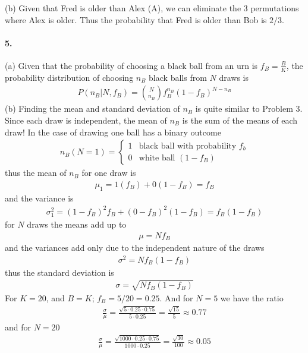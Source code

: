 \documentclass[../main.tex]{subfiles}
\begin{document}
(b) Given that Fred is older than Alex (A), we can eliminate the 3 permutations where Alex is older.
Thus the probability that Fred is older than Bob is $\boxed{2/3}$.

\paragraph{5.} (a) Given that the probability of choosing a black ball from an urn is
$f_B = \frac{B}{K}$, the probability distribution of choosing $n_B$ black balls from $N$ draws is
\begin{align*}
    \boxed{P(n_B | N, f_B) = \binom{N}{n_B} f_B^{n_B} (1 - f_B)^{N - n_B}}
\end{align*}
(b) Finding the mean and standard deviation of $n_B$ is quite similar to Problem 3. Since each draw
is independent, the mean of $n_B$ is the sum of the means of each draw! In the case of drawing one
ball has a binary outcome
\begin{align*}
    n_B(N = 1) = \begin{cases}
        1 & \textrm{black ball with probability } f_b \\
        0 & \textrm{white ball } (1 - f_B)
    \end{cases}
\end{align*}
thus the mean of $n_B$ for one draw is
\begin{align*}
    \mu_1 = 1 (f_B) + 0 (1 - f_B) = f_B
\end{align*}
and the variance is 
\begin{align*}
    \sigma_1^2 = (1 - f_B)^2 f_B + (0 - f_B)^2 (1 - f_B) = f_B(1 - f_B)
\end{align*}
for $N$ draws the means add up to
\begin{align*}
    \boxed{\mu = N f_B}
\end{align*}
and the variances add only due to the independent nature of the draws
\begin{align*}
    \sigma^2 = N f_B (1 - f_B)
\end{align*}
thus the standard deviation is
\begin{align*}
    \boxed{\sigma = \sqrt{N f_B (1 - f_B)}}
\end{align*}
For $K = 20$, and $B = K$; $f_B = 5/20 = 0.25$. And for $N = 5$ we have the ratio
\begin{align*}
    \frac{\sigma}{\mu} = \frac{\sqrt{5 \cdot 0.25 \cdot 0.75}}{5 \cdot 0.25}
    = \frac{\sqrt{15}}{5} \approx \boxed{0.77}
\end{align*}
and for $N = 20$
\begin{align*}
    \frac{\sigma}{\mu} = \frac{\sqrt{1000 \cdot 0.25 \cdot 0.75}}{1000 \cdot 0.25} 
    = \frac{\sqrt{30}}{100} \approx \boxed{0.05}
\end{align*}
\end{document}
